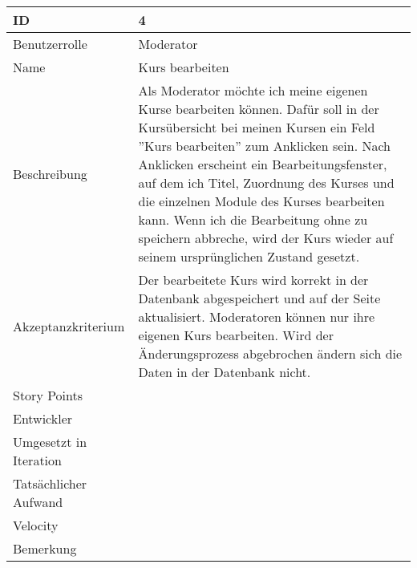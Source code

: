 \begin{tabularx}{\textwidth}{|p{}|X|}
	\hline
	ID & 4\\
	\hline
	Benutzerrolle & Moderator\\
	\hline
	Name & Kurs bearbeiten\\
	\hline
	Beschreibung & Als Moderator möchte ich meine eigenen Kurse bearbeiten können. Dafür soll in der Kursübersicht bei meinen Kursen ein Feld ''Kurs bearbeiten'' zum Anklicken sein. Nach Anklicken erscheint ein Bearbeitungsfenster, auf dem ich Titel, Zuordnung des Kurses und die einzelnen Module des Kurses bearbeiten kann. Wenn ich die Bearbeitung ohne zu speichern abbreche, wird der Kurs wieder auf seinem ursprünglichen Zustand gesetzt.\\
	\hline
	Akzeptanzkriterium & Der bearbeitete Kurs wird korrekt in der Datenbank abgespeichert und auf der Seite aktualisiert. Moderatoren können nur ihre eigenen Kurs bearbeiten. Wird der Änderungsprozess abgebrochen ändern sich die Daten in der Datenbank nicht.\\
	\hline
	Story Points & \\
	\hline
	Entwickler & \\
	\hline
	Umgesetzt in Iteration & \\
	\hline
	Tatsächlicher Aufwand & \\
	\hline
	Velocity & \\
	\hline
	Bemerkung & \\
	\hline
\end{tabularx}
\vspace{20pt}
